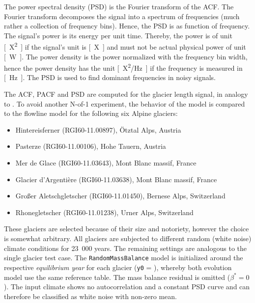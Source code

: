         The power spectral density (PSD) is the Fourier transform of the ACF. The Fourier transform decomposes the signal into a spectrum of frequencies (much rather a collection of frequency bins). Hence, the PSD is as function of frequency. The signal's power is its energy per unit time. Thereby, the power is of unit \si{[X^2]} if the signal's unit is \si{[X]} and must not be actual physical power of unit \si{[\watt]}. The power density is the power normalized with the frequency bin width, hence the power density has the unit \si{[X^2/\hertz]} if the frequency is measured in \si{[\hertz]}. The PSD is used to find dominant frequencies in noisy signals.

        The ACF, PACF and PSD are computed for the glacier length signal, in analogy to \citep{Roe2014}. To avoid another N-of-1 experiment, the behavior of the \vas{} model is compared to the flowline model for the following six Alpine glaciers:
        \begin{itemize}
            \item Hintereisferner (RGI60-11.00897), Ötztal Alps, Austria
            \item Pasterze (RGI60-11.00106), Hohe Tauern, Austria
            \item Mer de Glace (RGI60-11.03643), Mont Blanc massif, France
            \item Glacier d'Argentière (RGI60-11.03638), Mont Blanc massif, France
            \item Großer Aletschgletscher (RGI60-11.01450), Bernese Alps, Switzerland
            \item Rhonegletscher (RGI60-11.01238), Urner Alps, Switzerland
        \end{itemize}
        These glaciers are selected because of their size and notoriety, however the choice is somewhat arbitrary. All glaciers are subjected to different random (white noise) climate conditions for 23\ 000 years. The remaining settings are analogous to the single glacier test case. The \lstinline`RandomMassBalance` model is initialized around the respective \textit{equilibrium year} for each glacier (\lstinline`y0` = \tstar), whereby both evolution model use the same \tstar{} reference table. The mass balance residual is omitted ($\beta^* = 0$). The input climate shows no autocorrelation and a constant PSD curve and can therefore be classified as white noise with non-zero mean.
